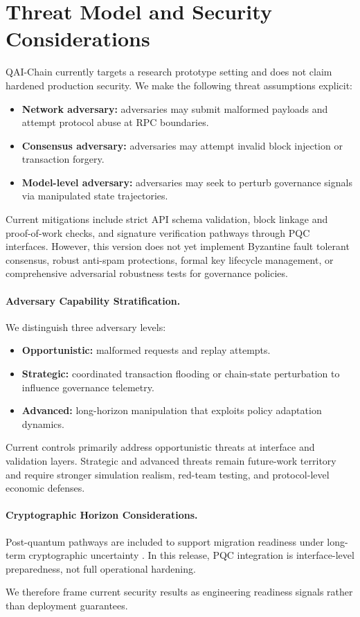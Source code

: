 \section{Threat Model and Security Considerations}

QAI-Chain currently targets a research prototype setting and does not claim hardened production security. We make the following threat assumptions explicit:

\begin{itemize}
    \item \textbf{Network adversary:} adversaries may submit malformed payloads and attempt protocol abuse at RPC boundaries.
    \item \textbf{Consensus adversary:} adversaries may attempt invalid block injection or transaction forgery.
    \item \textbf{Model-level adversary:} adversaries may seek to perturb governance signals via manipulated state trajectories.
\end{itemize}

Current mitigations include strict API schema validation, block linkage and proof-of-work checks, and signature verification pathways through PQC interfaces. However, this version does not yet implement Byzantine fault tolerant consensus, robust anti-spam protections, formal key lifecycle management, or comprehensive adversarial robustness tests for governance policies.

\paragraph{Adversary Capability Stratification.}
We distinguish three adversary levels:
\begin{itemize}
    \item \textbf{Opportunistic:} malformed requests and replay attempts.
    \item \textbf{Strategic:} coordinated transaction flooding or chain-state perturbation to influence governance telemetry.
    \item \textbf{Advanced:} long-horizon manipulation that exploits policy adaptation dynamics.
\end{itemize}

Current controls primarily address opportunistic threats at interface and validation layers. Strategic and advanced threats remain future-work territory and require stronger simulation realism, red-team testing, and protocol-level economic defenses.

\paragraph{Cryptographic Horizon Considerations.}
Post-quantum pathways are included to support migration readiness under long-term cryptographic uncertainty \cite{shor1999polynomial,nistpqc2024}. In this release, PQC integration is interface-level preparedness, not full operational hardening.

We therefore frame current security results as engineering readiness signals rather than deployment guarantees.